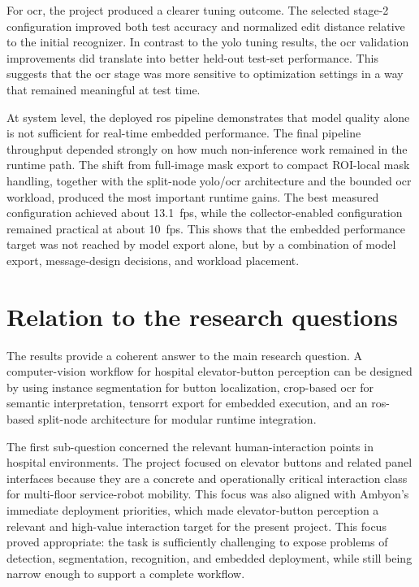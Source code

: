 For \gls{ocr}, the project produced a clearer tuning outcome. The selected stage-2
configuration improved both test accuracy and normalized edit distance relative
to the initial recognizer. In contrast to the \gls{yolo} tuning results, the
\gls{ocr} validation improvements did translate into better held-out test-set
performance. This suggests that the \gls{ocr} stage was more sensitive to
optimization settings in a way that remained meaningful at test time.

At system level, the deployed \gls{ros} pipeline demonstrates that model
quality alone is not sufficient for real-time embedded performance. The final
pipeline throughput depended strongly on how much non-inference work remained in
the runtime path. The shift from full-image mask export to compact ROI-local mask
handling, together with the split-node \gls{yolo}/\gls{ocr} architecture and the
bounded \gls{ocr} workload, produced the most important runtime gains. The best
measured configuration achieved about 13.1~\gls{fps}, while the collector-enabled
configuration remained practical at about 10~\gls{fps}. This shows that the
embedded performance target was not reached by model export alone, but by a
combination of model export, message-design decisions, and workload placement.

\section{Relation to the research questions}

The results provide a coherent answer to the main research question. A
computer-vision workflow for hospital elevator-button perception can be designed
by using instance segmentation for button localization, crop-based \gls{ocr} for
semantic interpretation, \gls{tensorrt} export for embedded execution, and an
\gls{ros}-based split-node architecture for modular runtime integration.

The first sub-question concerned the relevant human-interaction points in
hospital environments. The project focused on elevator buttons and related panel
interfaces because they are a concrete and operationally critical interaction
class for multi-floor service-robot mobility. This focus was also aligned with
Ambyon's immediate deployment priorities, which made elevator-button perception a relevant and high-value interaction target for the present project.
This focus proved appropriate: the
task is sufficiently challenging to expose problems of detection, segmentation,
recognition, and embedded deployment, while still being narrow enough to support
a complete workflow.

